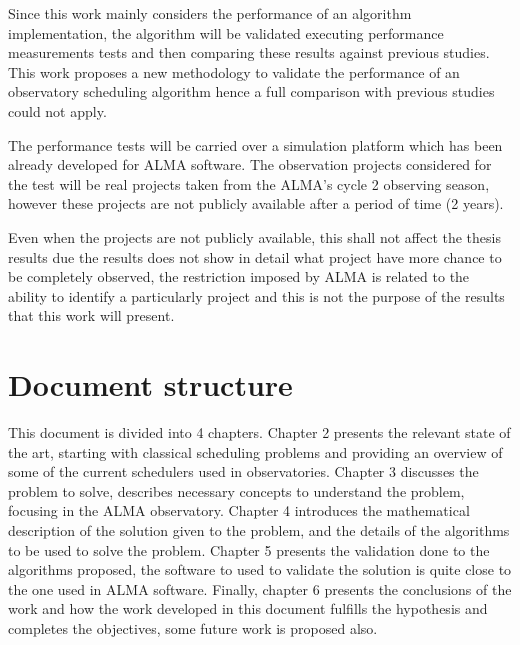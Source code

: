 Since this work mainly considers the performance of an algorithm implementation, the algorithm will be validated
executing performance measurements tests and then comparing these results against previous
studies. This work proposes a new methodology to validate the performance of an observatory
scheduling algorithm hence a full comparison with previous studies could not apply.

The performance tests will be carried over a simulation platform which has been already
developed for ALMA software. The observation projects considered for the test will be real
projects taken from the ALMA’s cycle 2 observing season, however these projects are not publicly
available after a period of time (2 years).

Even when the projects are not publicly available, this shall not affect the thesis results due the
results does not show in detail what project have more chance to be completely observed, the
restriction imposed by ALMA is related to the ability to identify a particularly project and this is
not the purpose of the results that this work will present.

\section{Document structure}
This document is divided into 4 chapters. Chapter 2 presents the relevant state of the art, starting with classical scheduling problems and providing an overview of some of the current schedulers used in observatories. Chapter 3 discusses the problem to solve, describes necessary concepts to understand the problem, focusing in the ALMA observatory. Chapter 4 introduces the mathematical description of the solution given to the problem, and the details of the algorithms to be used to solve the problem. Chapter 5 presents the validation done to the algorithms proposed, the software to used to validate the solution is quite close to the one used in ALMA software. Finally, chapter 6 presents the conclusions of the work and how the work developed in this document fulfills the hypothesis and completes the objectives, some future work is proposed also.